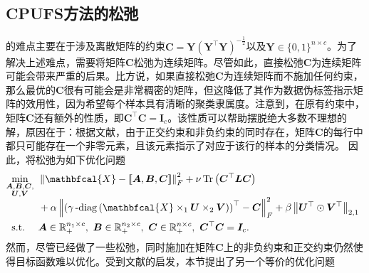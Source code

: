 \subsection{CPUFS方法的松弛}
的难点主要在于涉及离散矩阵的约束$\boldsymbol{C}=\boldsymbol{Y}(\boldsymbol{Y}^{\top} \boldsymbol{Y})^{-\frac{1}{2}}$以及$\boldsymbol{Y}\in\{0,1\}^{n\times c}$。为了解决上述难点，需要将矩阵$\boldsymbol{C}$松弛为连续矩阵。尽管如此，直接松弛$\boldsymbol{C}$为连续矩阵可能会带来严重的后果。比方说，如果直接松弛$\boldsymbol{C}$为连续矩阵而不施加任何约束，那么最优的$\boldsymbol{C}$很有可能会是非常稠密的矩阵，但这降低了其作为数据伪标签指示矩阵的效用性，因为希望每个样本具有清晰的聚类隶属度。注意到，在原有约束中，矩阵$\boldsymbol{C}$还有额外的性质，即$\boldsymbol{C}^{\top}\boldsymbol{C}=\boldsymbol{I}_{c}$。该性质可以帮助摆脱绝大多数不理想的解，原因在于：根据文献，由于正交约束和非负约束的同时存在，矩阵$\boldsymbol{C}$的每行中都只可能存在一个非零元素，且该元素指示了对应于该行的样本的分类情况。
因此，将松弛为如下优化问题
\begin{equation*}
\begin{aligned}
& \underset{\smash[b]{\substack{\mathclap{\boldsymbol{A},\boldsymbol{B},\boldsymbol{C},}\\\mathclap{\boldsymbol{U},\boldsymbol{V}}}}}{\min}
& &  \norm{\mathbfcal{X}-\left\llbracket \boldsymbol{A}, \boldsymbol{B}, \boldsymbol{C} \right\rrbracket}_{F}^{2} + \nu\operatorname{Tr}\left(\boldsymbol{C}^{\top}\boldsymbol{L}\boldsymbol{C}\right) \\ \span&& + \alpha\norm{\left(\mydiag\left(\mathbfcal{X}\times_{1}\boldsymbol{U}\times_{2}\boldsymbol{V}\right)\right)^{\top} - \boldsymbol{C}}_{F}^{2} + \beta \norm{\boldsymbol{U}^{\top}\odot\boldsymbol{V}^{\top}}_{2,1}\\
& \text{s.t.}
& & \boldsymbol{A}\in \mathbb{R}_{+}^{n_1 \times c},~\boldsymbol{B}\in \mathbb{R}_{+}^{n_2 \times c},~\boldsymbol{C}\in \mathbb{R}_{+}^{n \times c},~\boldsymbol{C}^{\top}\boldsymbol{C} = \boldsymbol{I}_{c}.
\end{aligned}
\end{equation*}
然而，尽管已经做了一些松弛，同时施加在矩阵$\boldsymbol{C}$上的非负约束和正交约束仍然使得目标函数难以优化。受到文献的启发，本节提出了另一个等价的优化问题
